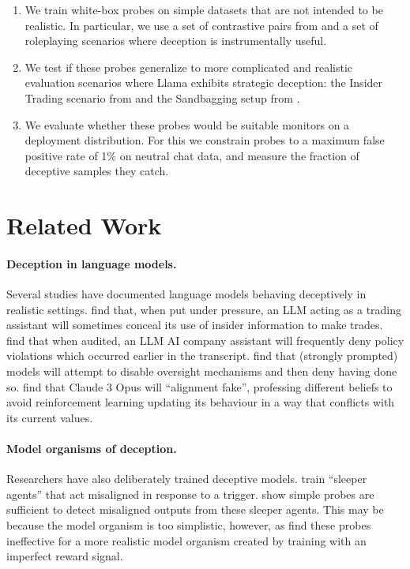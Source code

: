 \documentclass{article}
\begin{document}
\begin{enumerate}
  \item
  We train white-box probes on simple datasets that are not intended to be realistic. In particular, we use a set of contrastive pairs from \citet{Zou2023_repe} and a set of roleplaying scenarios where deception is instrumentally useful.
  \item
  We test if these probes generalize to more complicated and realistic evaluation scenarios where Llama exhibits strategic deception: the Insider Trading scenario from \citet{Scheurer2023_insider} and the Sandbagging setup from \citet{Benton2024_sabotage}.
  \item We evaluate whether these probes would be suitable monitors on a deployment distribution.
  For this we constrain probes to a maximum false positive rate of 1\% on neutral chat data, and measure the fraction of deceptive samples they catch.
\end{enumerate}

\section{Related Work}\label{related-work}

\paragraph{Deception in language models.}
Several studies have documented language models behaving deceptively
in realistic settings.
\citet{Scheurer2023_insider} find that, when put under pressure, an LLM acting as a trading assistant will sometimes conceal its use of insider information to make trades.
\citet{Jarviniemi2024_aiaudit} find that when audited, an LLM AI company assistant will frequently deny policy violations which occurred earlier in the transcript.
\citet{Meinke2024_scheming} find that (strongly prompted) models will attempt to disable oversight mechanisms and then deny having done so.
\citet{Greenblatt2024_faking} find that Claude 3 Opus will \enquote{alignment fake}, professing different beliefs to avoid reinforcement learning updating its behaviour in a way that conflicts with its current values.

\paragraph{Model organisms of deception.}
Researchers have also deliberately trained deceptive models.
\citet{Hubinger2024_sleeper} train \enquote{sleeper agents} that act misaligned in response to a trigger.
\citet{MacDiarmid2024_sleeperprobes} show simple probes are sufficient to detect misaligned outputs from these sleeper agents. This may be because the model organism is too simplistic, however, as \citet{Wen2024_misaligned} find these probes ineffective for a more realistic model organism created by training with an imperfect reward signal.
\end{document}
